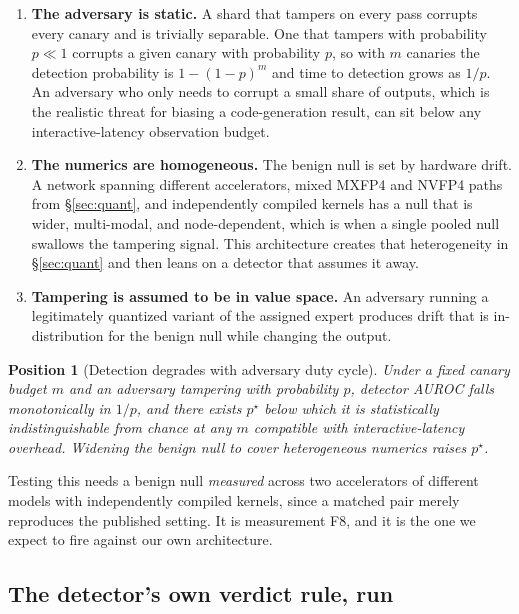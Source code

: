 \documentclass[11pt]{article}
\newtheorem{position}{Position}
\begin{document}
\begin{enumerate}[label=(C\arabic*),itemsep=3pt]
\item \textbf{The adversary is static.} A shard that tampers on every pass corrupts every canary and is trivially separable. One that tampers with probability $p \ll 1$ corrupts a given canary with probability $p$, so with $m$ canaries the detection probability is $1-(1-p)^m$ and time to detection grows as $1/p$. An adversary who only needs to corrupt a small share of outputs, which is the realistic threat for biasing a code-generation result, can sit below any interactive-latency observation budget.
\item \textbf{The numerics are homogeneous.} The benign null is set by hardware drift. A network spanning different accelerators, mixed MXFP4 and NVFP4 paths from \S\ref{sec:quant}, and independently compiled kernels has a null that is wider, multi-modal, and node-dependent, which is when a single pooled null swallows the tampering signal. This architecture creates that heterogeneity in \S\ref{sec:quant} and then leans on a detector that assumes it away.
\item \textbf{Tampering is assumed to be in value space.} An adversary running a legitimately quantized variant of the assigned expert produces drift that is in-distribution for the benign null while changing the output.
\end{enumerate}

\begin{position}[Detection degrades with adversary duty cycle]
\label{conj:canary}
Under a fixed canary budget $m$ and an adversary tampering with probability $p$, detector AUROC falls monotonically in $1/p$, and there exists $p^\star$ below which it is statistically indistinguishable from chance at any $m$ compatible with interactive-latency overhead. Widening the benign null to cover heterogeneous numerics raises $p^\star$.
\end{position}

Testing this needs a benign null \emph{measured} across two accelerators of different models with independently compiled kernels, since a matched pair merely reproduces the published setting. It is measurement F8, and it is the one we expect to fire against our own architecture.

\subsection{The detector's own verdict rule, run}
\label{sec:canaryrun}
\end{document}
